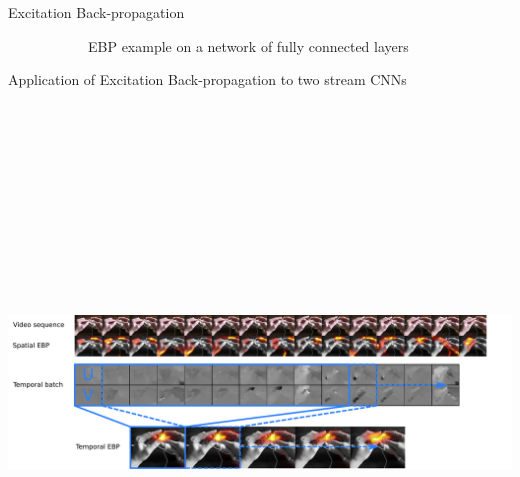 \documentclass[final]{beamer} %
\begin{document}
\begin{frame}[t]
\begin{block}{Excitation Back-propagation}
\begin{figure}
\begin{subfigure}{0.86\linewidth}
          \vspace{2cm}
          \centering
          EBP example on a network of fully connected layers
        \end{subfigure}
      \end{figure}
    \end{block}

    \begin{block}{Application of Excitation Back-propagation to two stream CNNs}
      \centering
      \includegraphics[height=16cm]{media/images/ebp-two-stream}
    \end{block}


\end{frame}
\end{document}
